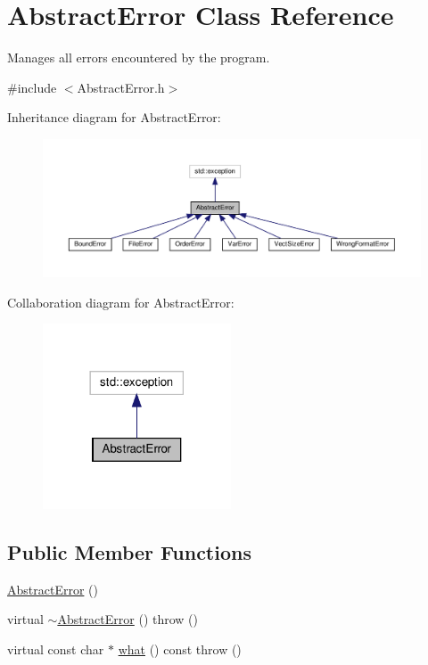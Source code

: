 \hypertarget{classAbstractError}{}\section{Abstract\+Error Class Reference}
\label{classAbstractError}


Manages all errors encountered by the program.  




{\ttfamily \#include $<$Abstract\+Error.\+h$>$}



Inheritance diagram for Abstract\+Error\+:\nopagebreak
\begin{figure}[H]
\begin{center}
\leavevmode
\includegraphics[width=350pt]{classAbstractError__inherit__graph}
\end{center}
\end{figure}


Collaboration diagram for Abstract\+Error\+:\nopagebreak
\begin{figure}[H]
\begin{center}
\leavevmode
\includegraphics[width=158pt]{classAbstractError__coll__graph}
\end{center}
\end{figure}
\subsection*{Public Member Functions}
\begin{DoxyCompactItemize}
\item 
\hyperlink{classAbstractError_ae40c5440712bdcf91b2b7d733e2ee80b}{Abstract\+Error} ()
\item 
virtual \hyperlink{classAbstractError_a9b35711452ca3e32ac0609bcb493c181}{$\sim$\+Abstract\+Error} ()  throw ()
\item 
virtual const char $\ast$ \hyperlink{classAbstractError_a19735c7a9b5f6e84db606292967667a9}{what} () const  throw ()
\end{DoxyCompactItemize}


